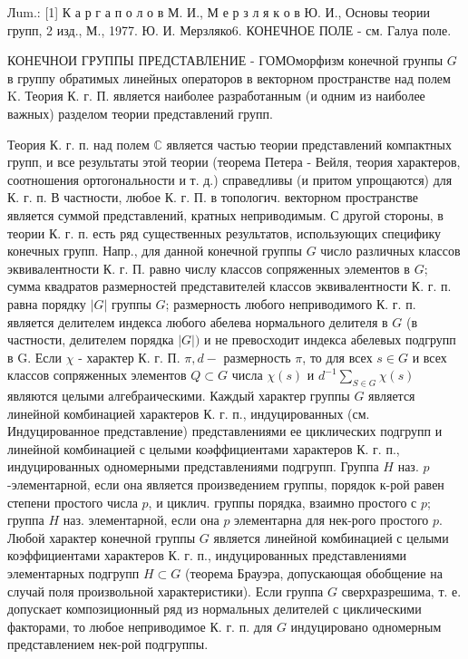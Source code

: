 \documentclass[10pt]{article}
\begin{document}
Лum.: [1] К а р г а п о л о в М. И., М е р з л я к о в Ю. И., Основы теории групп, 2 изд., М., 1977. Ю. И. Мерзляко6. КОНЕЧНОЕ ПОЛЕ - см. Галуа поле.



КОНЕЧНОИ ГРУППЫ ПРЕДСТАВЛЕНИЕ - ГОМОморфизм конечной грунпы $G$ в группу обратимых линейных операторов в векторном пространстве над полем K. Теория К. г. П. является наиболее разработанным (и одним из наиболее важных) разделом теории представлений групп.



Теория К. г. п. над полем $\mathbb{C}$ является частью теории представлений компактных групп, и все результаты этой теории (теорема Петера - Вейля, теория характеров, соотношения ортогональности и т. д.) справедливы (и притом упрощаются) для К. г. п. В частности, любое К. г. П. в топологич. векторном пространстве является суммой представлений, кратных неприводимым. С другой стороны, в теории К. г. п. есть ряд существенных результатов, использующих специфику конечных групп. Напр., для данной конечной группы $G$ число различных классов эквивалентности К. г. П. равно числу классов сопряженных элементов в $G$; сумма квадратов размерностей представителей классов эквивалентности К. г. п. равна порядку $|G|$ группы $G$; размерность любого неприводимого К. г. п. является делителем индекса любого абелева нормального делителя в $G$ (в частности, делителем порядка $|G|)$ и не превосходит индекса абелевых подгрупп в G. Если $\chi$ - характер К. г. П. $\pi, d-$ размерность $\pi$, то для всех $s \in G$ и всех классов сопряженных элементов $Q \subset G$ числа $\chi(s)$ и $d^{-1} \sum_{S \in G} \chi(s)$ являются целыми алгебраическими. Каждый характер группы $G$ является линейной комбинацией характеров К. г. п., индуцированных (см. Индуцированное представление) представлениями ее циклических подгрупп и линейной комбинацией с целыми коәффициентами характеров К. г. п., индуцированных одномерными представлениями подгрупп. Группа $H$ наз. $p$-элементарной, если она является произведением группы, порядок к-рой равен степени простого числа $p$, и циклич. группы порядка, взаимно простого с $p$; группа $H$ наз. элементарной, если она $p$ элементарна для нек-рого простого $p$. Любой характер конечной группы $G$ является линейной комбинацией с целыми коэффициентами характеров К. г. п., индуцированных представлениями элементарных подгрупп $H \subset G$ (теорема Брауэра, допускающая обобщение на случай поля произвольной характеристики). Если группа $G$ сверхразрешима, т. е. допускает композиционный ряд из нормальных делителей с циклическими факторами, то любое неприводимое К. г. п. для $G$ индуцировано одномерным представлением нек-рой подгруппы.
\end{document}
